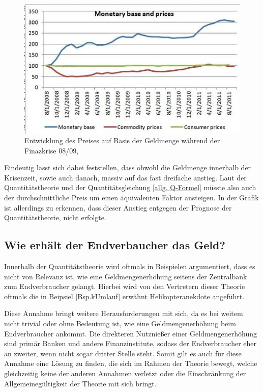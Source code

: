 \begin{figure}[H]
    \centering
    \includegraphics{img/100711krugman3-blog480.jpg}
    \caption{Entwicklung des Preises auf Basis der Geldmenge während der Finazkrise 08/09, \cite{Krugman2011}}
\end{figure}    

Eindeutig lässt sich dabei feststellen, dass obwohl die Geldmenge innerhalb der Krisenzeit, sowie auch danach, massiv auf das fast dreifache anstieg. Laut der Quantitätstheorie und der Quantitätsgleichung \vref{allg. Q-Formel} müsste also auch der durchschnittliche Preis um einen äquivalenten Faktor ansteigen. In der Grafik ist allerdings zu erkennen, dass dieser Anstieg entgegen der Prognose der Quantitätstheorie, nicht erfolgte.

\subsection{Wie erhält der Endverbaucher das Geld?}

Innerhalb der Quantitätstheorie wird oftmals in Beispielen argumentiert, dass es nicht von Relevanz ist, wie eine Geldmengenerhöhung seitens der Zentralbank zum Endverbraucher gelangt. Hierbei wird von den Vertretern dieser Theorie oftmals die in Beipsiel \vref{Bsp.kUmlauf} erwähnt Helikopteranekdote angeführt.


Diese Annahme bringt weitere Herausforderungen mit sich, da es bei weitem nicht trivial oder ohne Bedeutung ist, wie eine Geldmengenerhöhung beim Endverbraucher ankommt. Die direkteren Nutznießer einer Geldmengenerhöhung sind primär Banken und andere Finanzinstitute, sodass der Endverbraucher eher an zweiter, wenn nicht sogar dritter Stelle steht. Somit gilt es auch für diese Annahme eine Lösung zu finden, die sich im Rahmen der Theorie bewegt, welche gleichzeitig keine der anderen Annahmen verletzt oder die Einschränkung der Allgemeinegültigkeit der Theorie mit sich bringt.